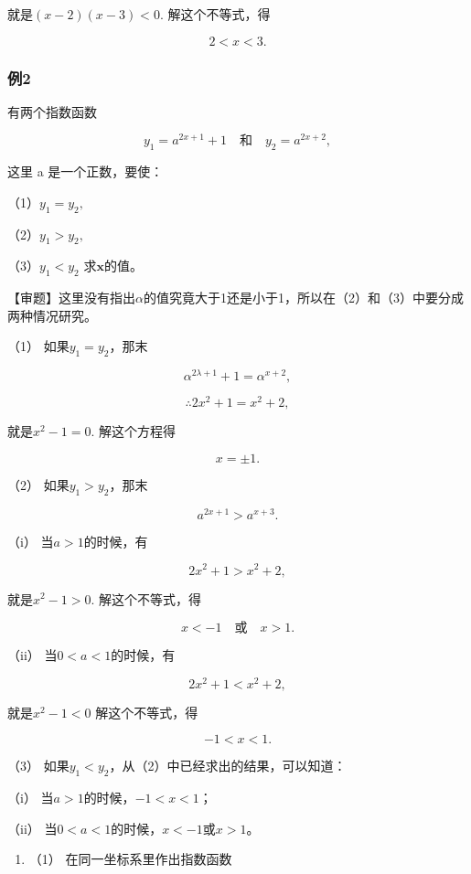 就是\((x - 2)(x - 3) < 0.\) 解这个不等式，得

\[
2 < x < 3.
\]

\subsubsection{例2}

有两个指数函数

\[
y_{1} = a^{2 x + 1} + 1 \quad \text{和} \quad y_{2} = a^{2 x + 2},
\]

这里 a 是一个正数，要使：

（1）\(y_{1}=y_{2},\)

（2）\(y_{1} > y_{2},\)

（3）\(y_{1}<y_{2}\) 求\(\pmb{x}\)的值。

【审题】这里没有指出\(\alpha\)的值究竟大于1还是小于1，所以在（2）和（3）中要分成两种情况研究。

 （1） 如果\(y_{1} = y_{2}\)，那末

\[
\alpha^{2 \lambda + 1} + 1 = \alpha^{x + 2},
\]

\[
\therefore 2 x^{2} + 1 = x^{2} + 2,
\]

就是\(x^{2} - 1 = 0.\) 解这个方程得

\[
x = \pm 1.
\]

（2） 如果\(y_{1} > y_{2}\)，那末

\[
a^{2 x + 1} > a^{x + 3}.
\]

（i） 当\(a > 1\)的时候，有

\[
2 x^{2} + 1 > x^{2} + 2,
\]

就是\(x^{2} - 1 > 0.\) 解这个不等式，得

\[
x < - 1 \quad \text{或} \quad x > 1.
\]

（ii） 当\(0 < a < 1\)的时候，有

\[
2 x^{2} + 1 < x^{2} + 2,
\]

就是\(x^{2} - 1 < 0\) 解这个不等式，得

\[
- 1 < x < 1.
\]

（3） 如果\(y_1 < y_2\)，从（2）中已经求出的结果，可以知道：

（i） 当\(a > 1\)的时候，\(-1 < x < 1\)；

（ii） 当\(0 < a < 1\)的时候，\(x < -1\)或\(x > 1\)。

\begin{enumerate}
\item
  （1） 在同一坐标系里作出指数函数
\end{enumerate}

